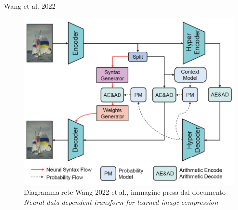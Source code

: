     \begin{frame}{Wang et al\footnotemark[1]. 2022}
        \begin{figure}[!h]
            \centering
            \includegraphics[width=0.6\textheight]{Immagini/Wang2022_Rete.png}
            \caption{Diagramma rete Wang 2022 et al., immagine presa dal documento \textit{Neural data-dependent transform for learned image compression}\footnotemark[1]}
            \label{fig:Wang2022Network}
        \end{figure}
    \end{frame}
    